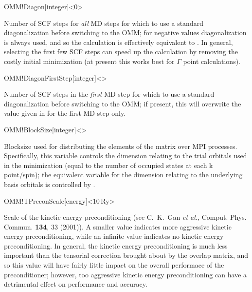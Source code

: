 \begin{fdfentry}{OMM!Diagon}[integer]<0>

  Number of SCF steps for \emph{all} MD steps for which to use a
  standard diagonalization before switching to the OMM; for negative
  values diagonalization is always used, and so the calculation is
  effectively equivalent to  .
  In general, selecting the first few SCF steps can speed up the
  calculation by removing the costly initial minimization (at present
  this works best for $\Gamma$ point calculations).

\end{fdfentry}

\begin{fdfentry}{OMM!DiagonFirstStep}[integer]<>
  
  Number of SCF steps in the \emph{first} MD step for which to use a
  standard diagonalization before switching to the OMM; if present,
  this will overwrite the value given in  for the
  first MD step only.

\end{fdfentry}

\begin{fdfentry}{OMM!BlockSize}[integer]<>
  
  Blocksize used for distributing the elements of the matrix over MPI
  processes. Specifically, this variable controls the dimension
  relating to the trial orbitals used in the minimization (equal to
  the number of occupied states at each k point/spin); the equivalent
  variable for the dimension relating to the underlying basis orbitals
  is controlled by .

\end{fdfentry}

\begin{fdfentry}{OMM!TPreconScale}[energy]<$10\,\mathrm{Ry}$>
  
  Scale of the kinetic energy preconditioning (see C.~K.~Gan \emph{et
      al.}, Comput. Phys. Commun.  \textbf{134}, 33 (2001)). A smaller
  value indicates more aggressive kinetic energy preconditioning,
  while an infinite value indicates no kinetic energy
  preconditioning. In general, the kinetic energy preconditioning is
  much less important than the tensorial correction brought about by
  the overlap matrix, and so this value will have fairly little impact
  on the overall performace of the preconditioner; however, too
  aggressive kinetic energy preconditioning can have a detrimental
  effect on performance and accuracy.

\end{fdfentry}

